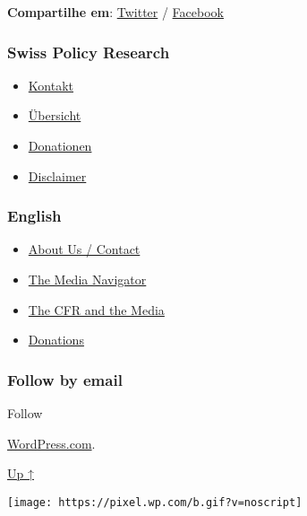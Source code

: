 \textbf{Compartilhe em}:
\href{https://twitter.com/intent/tweet?url=https://swprs.org/fatos-sobre-covid-19/}{Twitter}
/
\href{https://www.facebook.com/share.php?u=https://swprs.org/fatos-sobre-covid-19/}{Facebook}

\hypertarget{swiss-policy-research}{%
\subsubsection{Swiss Policy Research}\label{swiss-policy-research}}

\begin{itemize}
\tightlist
\item
  \href{https://swprs.org/kontakt/}{Kontakt}
\item
  \href{https://swprs.org/uebersicht/}{Übersicht}
\item
  \href{https://swprs.org/donationen/}{Donationen}
\item
  \href{https://swprs.org/disclaimer/}{Disclaimer}
\end{itemize}

\hypertarget{english}{%
\subsubsection{English}\label{english}}

\begin{itemize}
\tightlist
\item
  \href{https://swprs.org/contact/}{About Us / Contact}
\item
  \href{https://swprs.org/media-navigator/}{The Media Navigator}
\item
  \href{https://swprs.org/the-american-empire-and-its-media/}{The CFR
  and the Media}
\item
  \href{https://swprs.org/donations/}{Donations}
\end{itemize}

\hypertarget{follow-by-email}{%
\subsubsection{Follow by email}\label{follow-by-email}}

Follow

\href{https://wordpress.com/?ref=footer_custom_com}{WordPress.com}.

\protect\hyperlink{}{Up ↑}

\texttt{[image: https://pixel.wp.com/b.gif?v=noscript]}
